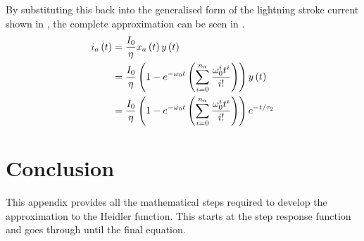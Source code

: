 By substituting this back into the generalised form of the lightning stroke current shown in , the complete approximation can be seen in .
\begin{align}
    i_a \left( t \right) & = \frac{I_0}{\eta} x_a \left( t \right) y \left( t \right) \label{eqn:app_eqn_small} \\
    & = \frac{I_0}{\eta} \left ( 1 - e^{-\omega_0 t} \left ( \sum\limits_{i=0}^{n_a} \frac{\omega_0^i t^i}{i!} \right ) \right ) y \left( t \right) \notag\\
    & = \frac{I_0}{\eta} \left ( 1 - e^{-\omega_0 t} \left ( \sum\limits_{i=0}^{n_a} \frac{\omega_0^i t^i}{i!} \right ) \right ) e^{-t/\tau_2}
    \label{eqn:app_approx}
\end{align}


\section{Conclusion}
\label{sec:app_dev_conclusion}
This appendix provides all the mathematical steps required to develop the approximation to the Heidler function. This starts at the step response function and goes through until the final equation.

